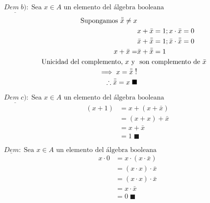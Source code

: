 \begin{multicols}{2}
	\noindent
	$\underline{Dem \;b)}:\; \text{Sea $x\in A$ un elemento del álgebra booleana}$
	\begin{align*}
		\text{Supongamos } \bar{\bar{x}}\neq x                                                                               \\
		                                                            & x+\bar{x}=1; x\cdot{\bar{x}}=0                         \\
		                                                            & \bar{x}+\bar{\bar{x}}=1; \bar{x}\cdot{\bar{\bar{x}}}=0 \\
		x+\bar{x}=                                                  & \bar{x}+\bar{\bar{x}}=1                                \\
		\text{Unicidad del complemento, }x \text{ y } &   \text{ son complemento de } \bar{x}                    \\
		\implies x = \bar{\bar{x}} \mathrel{\text{\large!}}                                                                  \\
		\therefore \bar{\bar{x}}= x\;\blacksquare
	\end{align*}
\end{multicols}

\begin{multicols}{2}
	\noindent
	$\underline{Dem \;c)}:\; \text{Sea $x\in A$ un elemento del álgebra booleana}$
	\begin{align*}
		(x+1) & = x+(x+\bar{x}) \\
		      & = (x+x)+\bar{x} \\
		      & = x+\bar{x}     \\
		      & = 1 \;\blacksquare
	\end{align*}

	\columnbreak

	\noindent
	$\underline{Dem}:\; \text{Sea $x\in A$ un elemento del álgebra booleana}$
	\begin{align*}
		x\cdot0 & = x\cdot(x\cdot \bar{x})  \\
		        & = (x\cdot x)\cdot \bar{x} \\
		        & = (x\cdot x)\cdot \bar{x} \\
		        & = x\cdot \bar{x}          \\
		        & = 0\;\blacksquare
	\end{align*}
\end{multicols}

